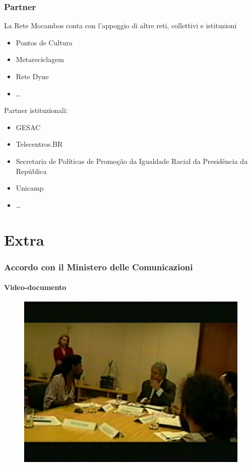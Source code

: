 \documentclass{beamer}
\begin{document}
\begin{frame}
 \frametitle{Partner}
 La Rete Mocambos conta con l'appoggio di altre reti, collettivi e istituzioni
  
  \begin{itemize}
  \item Pontos de Cultura 
  \item Metareciclagem
  \item Rete Dyne 
  \item \ldots
  \end{itemize}
  
  Partner istituzionali:
  \begin{itemize}
  \item GESAC
  \item Telecentros.BR
  \item Secretaria de Políticas de Promoção da Igualdade Racial da
    Presidência da República
  \item Unicamp 
  \item \ldots
  \end{itemize}
  
\end{frame}

\section{Extra}

\begin{frame}
  \frametitle{Accordo con il Ministero delle Comunicazioni}
  \framesubtitle{Video-documento}
	\begin{figure}
		\includegraphics[height=0.6\textheight]{./Figure/videomc.pdf}
	\end{figure}

 \end{frame}
\end{document}
